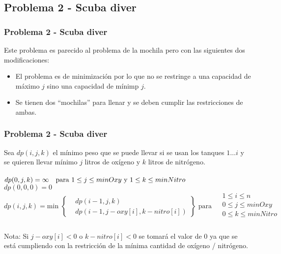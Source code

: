 \documentclass{beamer}
\begin{document}
	\subsection{Problema 2 - Scuba diver}
	\begin{frame}
		\frametitle{Problema 2 - Scuba diver}
		Este problema es parecido al problema de la mochila pero con las siguientes dos modificaciones:
		\begin{itemize}
			\item El problema es de minimización por lo que no se restringe a una capacidad de máximo $j$ sino una capacidad de mínimp $j$.
			\item Se tienen dos ``mochilas'' para llenar y se deben cumplir las restricciones de ambas.
		\end{itemize}		
	\end{frame}
	
	\begin{frame}
		\frametitle{Problema 2 - Scuba diver}
		Sea $dp(i, j, k)$ el mínimo peso que se puede llevar si se usan los tanques $1 \ldots i$ y se quieren llevar mínimo $j$ litros de oxígeno y $k$ litros de nitrógeno.\\ \quad \\
		$dp(0, j, k) = \infty \text{\quad para } 1 \leq j \leq minOxy \text{ y } 1 \leq k \leq minNitro$ \\
		$dp(0, 0, 0) = 0$\\
		$dp(i, j, k) =  \text{min } 
		\left\{
			\begin{aligned}
				& dp(i - 1, j, k)  \\
			 	& dp(i - 1, j - oxy[i], k - nitro[i] )
			\end{aligned}
		\right\}
		\text{ para } 
			\begin{aligned}
				& 1 \leq i \leq n\\
				& 0 \leq j \leq minOxy\\
				& 0 \leq k \leq minNitro\\
			\end{aligned}
		$\\ \quad \\
		Nota: Si $j - oxy[i] < 0$ o $k - nitro[i] < 0$ se tomará el valor de 0 ya que se está cumpliendo con la restricción de la mínima cantidad de oxígeno / nitrógeno.
	\end{frame}
	
\end{document}
